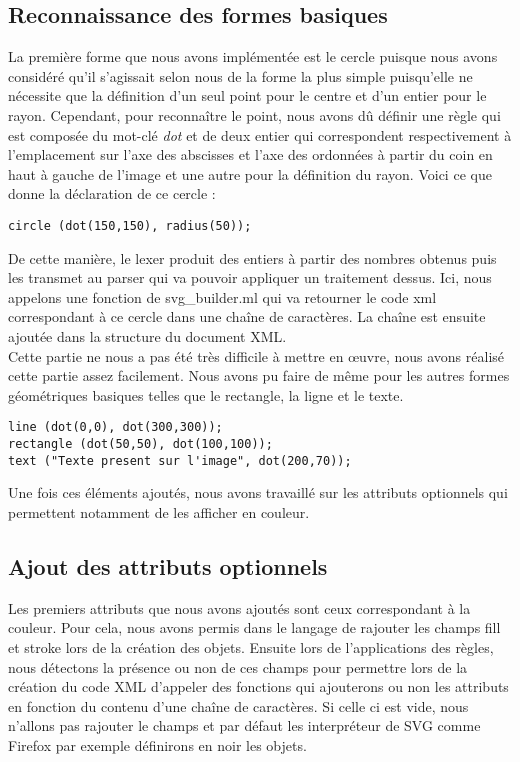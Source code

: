 		
		\subsection{Reconnaissance des formes basiques}
		La première forme que nous avons implémentée est le cercle puisque nous avons considéré qu'il s'agissait selon nous de la forme la plus simple puisqu'elle ne nécessite que la définition d'un seul point pour le centre et d'un entier pour le rayon. Cependant, pour reconnaître le point, nous avons dû définir une règle qui est composée du mot-clé \emph{dot} et de deux entier qui correspondent respectivement à l'emplacement sur l'axe des abscisses et l'axe des ordonnées à partir du coin en haut à gauche de l'image et une autre pour la définition du rayon. Voici ce que donne la déclaration de ce cercle :
\begin{lstlisting}[morekeywords={circle, dot, radius}]
circle (dot(150,150), radius(50));
\end{lstlisting}

		De cette manière, le lexer produit des entiers à partir des nombres obtenus puis les transmet au parser qui va pouvoir appliquer un traitement dessus. Ici, nous appelons une fonction de svg\_builder.ml qui va retourner le code xml correspondant à ce cercle dans une chaîne de caractères. La chaîne est ensuite ajoutée dans la structure du document XML.\\

		Cette partie ne nous a pas été très difficile à mettre en œuvre, nous avons réalisé cette partie assez facilement. Nous avons pu faire de même pour les autres formes géométriques basiques telles que le rectangle, la ligne et le texte.

\begin{lstlisting}[morekeywords={line, dot, rectangle, text}]
line (dot(0,0), dot(300,300));
rectangle (dot(50,50), dot(100,100)); 
text ("Texte present sur l'image", dot(200,70));
\end{lstlisting}

		Une fois ces éléments ajoutés, nous avons travaillé sur les attributs optionnels qui permettent notamment de les afficher en couleur.

		\subsection{Ajout des attributs optionnels}
		Les premiers attributs que nous avons ajoutés sont ceux correspondant à la couleur. Pour cela, nous avons permis dans le langage de rajouter les champs fill et stroke lors de la création des objets. Ensuite lors de l'applications des règles, nous détectons la présence ou non de ces champs pour permettre lors de la création du code XML d'appeler des fonctions qui ajouterons ou non les attributs en fonction du contenu d'une chaîne de caractères. Si celle ci est vide, nous n'allons pas rajouter le champs et par défaut les interpréteur de SVG comme Firefox par exemple définirons en noir les objets.\\
		
